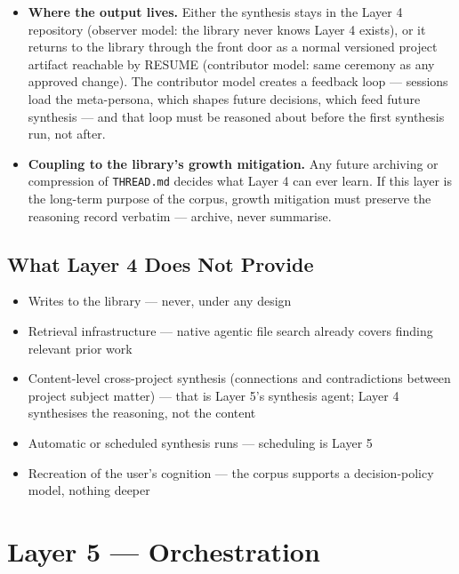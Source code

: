 \documentclass[12pt,letterpaper]{article}
\begin{document}
\begin{itemize}
  \item \textbf{Where the output lives.} Either the synthesis stays in
        the Layer 4 repository (observer model: the library never
        knows Layer 4 exists), or it returns to the library through
        the front door as a normal versioned project artifact
        reachable by RESUME (contributor model: same ceremony as any
        approved change). The contributor model creates a feedback
        loop --- sessions load the meta-persona, which shapes future
        decisions, which feed future synthesis --- and that loop must
        be reasoned about before the first synthesis run, not after.
  \item \textbf{Coupling to the library's growth mitigation.} Any
        future archiving or compression of \texttt{THREAD.md} decides
        what Layer 4 can ever learn. If this layer is the long-term
        purpose of the corpus, growth mitigation must preserve the
        reasoning record verbatim --- archive, never summarise.
\end{itemize}

\subsection{What Layer 4 Does Not Provide}

\begin{itemize}
  \item Writes to the library --- never, under any design
  \item Retrieval infrastructure --- native agentic file search
        already covers finding relevant prior work
  \item Content-level cross-project synthesis (connections and
        contradictions between project subject matter) --- that is
        Layer 5's synthesis agent; Layer 4 synthesises the reasoning,
        not the content
  \item Automatic or scheduled synthesis runs --- scheduling is Layer 5
  \item Recreation of the user's cognition --- the corpus supports a
        decision-policy model, nothing deeper
\end{itemize}

\section{Layer 5 --- Orchestration}
\end{document}
